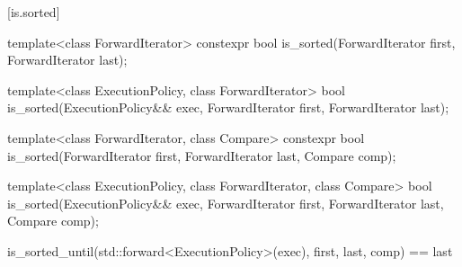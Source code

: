 [is.sorted]{}

%
\begin{itemdecl}
template<class ForwardIterator>
  constexpr bool is_sorted(ForwardIterator first, ForwardIterator last);
\end{itemdecl}

\begin{itemdescr}
\pnum
\returns {}
\end{itemdescr}

%
\begin{itemdecl}
template<class ExecutionPolicy, class ForwardIterator>
  bool is_sorted(ExecutionPolicy&& exec,
                 ForwardIterator first, ForwardIterator last);
\end{itemdecl}

\begin{itemdescr}
\pnum
\returns {}
\end{itemdescr}


%
\begin{itemdecl}
template<class ForwardIterator, class Compare>
  constexpr bool is_sorted(ForwardIterator first, ForwardIterator last,
                           Compare comp);
\end{itemdecl}

\begin{itemdescr}
\pnum
\returns {}
\end{itemdescr}


%
\begin{itemdecl}
template<class ExecutionPolicy, class ForwardIterator, class Compare>
  bool is_sorted(ExecutionPolicy&& exec,
                 ForwardIterator first, ForwardIterator last,
                 Compare comp);
\end{itemdecl}

\begin{itemdescr}
\pnum
\returns
\begin{codeblock}
is_sorted_until(std::forward<ExecutionPolicy>(exec), first, last, comp) == last
\end{codeblock}
\end{itemdescr}


